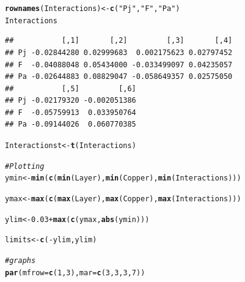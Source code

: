 \documentclass{article}\usepackage[]{graphicx}\usepackage[]{color}
\makeatletter
\newcommand{\hlnum}[1]{\textcolor[rgb]{0.686,0.059,0.569}{#1}}%
\newcommand{\hlstr}[1]{\textcolor[rgb]{0.192,0.494,0.8}{#1}}%
\newcommand{\hlcom}[1]{\textcolor[rgb]{0.678,0.584,0.686}{\textit{#1}}}%
\newcommand{\hlopt}[1]{\textcolor[rgb]{0,0,0}{#1}}%
\newcommand{\hlstd}[1]{\textcolor[rgb]{0.345,0.345,0.345}{#1}}%
\newcommand{\hlkwb}[1]{\textcolor[rgb]{0.69,0.353,0.396}{#1}}%
\newcommand{\hlkwc}[1]{\textcolor[rgb]{0.333,0.667,0.333}{#1}}%
\newcommand{\hlkwd}[1]{\textcolor[rgb]{0.737,0.353,0.396}{\textbf{#1}}}%
\newenvironment{kframe}{%
 \def\at@end@of@kframe{}%
 \ifinner\ifhmode%
  \def\at@end@of@kframe{\end{minipage}}%
  \begin{minipage}{\columnwidth}%
 \fi\fi%
 \def\FrameCommand##1{\hskip\@totalleftmargin \hskip-\fboxsep
 \colorbox{shadecolor}{##1}\hskip-\fboxsep
     \hskip-\linewidth \hskip-\@totalleftmargin \hskip\columnwidth}%
 \MakeFramed {\advance\hsize-\width
   \@totalleftmargin\z@ \linewidth\hsize
   \@setminipage}}%
 {\par\unskip\endMakeFramed%
 \at@end@of@kframe}
\newenvironment{knitrout}{}{} %
\makeatother
\begin{document}
\begin{knitrout}
\begin{kframe}
{\ttfamily\noindent\bfseries\color{errorcolor}{\#\# Error in eval(expr, envir, enclos): objet 'axislabels' introuvable}}\begin{alltt}
\hlkwd{rownames}\hlstd{(Interactions)} \hlkwb{<-} \hlkwd{c}\hlstd{(}\hlstr{"Pj"}\hlstd{,} \hlstr{"F"}\hlstd{,} \hlstr{"Pa"}\hlstd{)}
\hlstd{Interactions}
\end{alltt}
\begin{verbatim}
##           [,1]       [,2]         [,3]       [,4]
## Pj -0.02844280 0.02999683  0.002175623 0.02797452
## F  -0.04088048 0.05434000 -0.033499097 0.04235057
## Pa -0.02644883 0.08829047 -0.058649357 0.02575050
##           [,5]         [,6]
## Pj -0.02179320 -0.002051386
## F  -0.05759913  0.033950764
## Pa -0.09144026  0.060770385
\end{verbatim}
\begin{alltt}
\hlstd{Interactionst}\hlkwb{<-}\hlkwd{t}\hlstd{(Interactions)}

\hlcom{# Plotting}
\hlstd{ymin}\hlkwb{<-}\hlkwd{min}\hlstd{(}\hlkwd{c}\hlstd{(}\hlkwd{min}\hlstd{(Layer),}\hlkwd{min}\hlstd{(Copper),}\hlkwd{min}\hlstd{(Interactions)))}

\hlstd{ymax}\hlkwb{<-}\hlkwd{max}\hlstd{(}\hlkwd{c}\hlstd{(}\hlkwd{max}\hlstd{(Layer),}\hlkwd{max}\hlstd{(Copper),}\hlkwd{max}\hlstd{(Interactions)))}

\hlstd{ylim}\hlkwb{<-}\hlnum{0.03}\hlopt{+}\hlkwd{max}\hlstd{(}\hlkwd{c}\hlstd{(ymax,}\hlkwd{abs}\hlstd{(ymin)))}

\hlstd{limits}\hlkwb{<-}\hlkwd{c}\hlstd{(}\hlopt{-}\hlstd{ylim,ylim)}

\hlcom{#graphs}
\hlkwd{par}\hlstd{(}\hlkwc{mfrow}\hlstd{=}\hlkwd{c}\hlstd{(}\hlnum{1}\hlstd{,}\hlnum{3}\hlstd{),}\hlkwc{mar}\hlstd{=}\hlkwd{c}\hlstd{(}\hlnum{3}\hlstd{,}\hlnum{3}\hlstd{,}\hlnum{3}\hlstd{,}\hlnum{7}\hlstd{))}


\end{alltt}
\end{kframe}
\end{knitrout}
\end{document}

